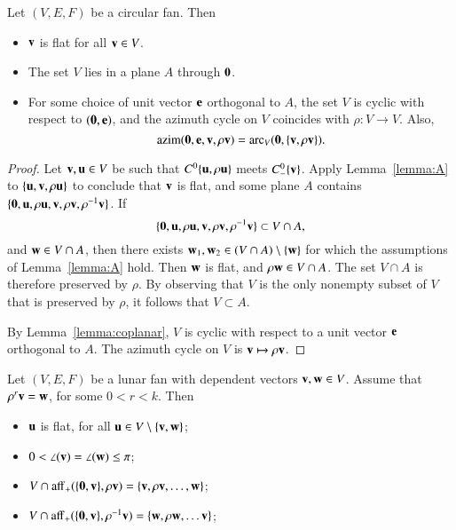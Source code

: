 \begin{lemma}\label{lemma:circular}
Let $(V,E,F)$ be a circular fan. Then
\begin{itemize}
\item ${\mathbf v}$ is flat for all ${\mathbf v}\in V$.
\item The set $V$ lies in a plane $A$ through ${\mathbf 0}$.
\item For some choice of unit vector ${\mathbf e}$ orthogonal to $A$, the set $V$ is cyclic with respect to
$({\mathbf 0},{\mathbf e})$, and the azimuth cycle on $V$ coincides with $\rho:V\to V$.
Also,
$$
{\operatorname{azim}}({\mathbf 0},{\mathbf e},{\mathbf v},\rho{\mathbf v}) = {\operatorname{arc}}_V({\mathbf 0},\{{\mathbf v},\rho {\mathbf v}\}).
$$
\end{itemize}
\end{lemma}

\begin{proof}  Let ${\mathbf v}, {\mathbf u}\in V$ be such that $C^0\{{\mathbf u},\rho {\mathbf u}\}$ meets $C^0_-\{{\mathbf v}\}$.  Apply
Lemma~\ref{lemma:A} to $\{{\mathbf u},{\mathbf v},\rho {\mathbf u}\}$ to conclude that ${\mathbf v}$ is flat, and some plane $A$ contains
$\{{\mathbf 0},{\mathbf u},\rho{\mathbf u},{\mathbf v},\rho {\mathbf v},\rho^{-1} {\mathbf v}\}$.  If 
$$
\{{\mathbf 0},{\mathbf u},\rho {\mathbf u},{\mathbf v},\rho {\mathbf v},\rho^{-1} {\mathbf v}\} \subset V\cap A,
$$
and ${\mathbf w}\in V\cap A$, then there exists ${\mathbf w}_1,{\mathbf w}_2\in (V\cap A)\setminus\{{\mathbf w}\}$ for which
the assumptions of Lemma~\ref{lemma:A} hold.  Then ${\mathbf w}$ is flat, and
$\rho {\mathbf w} \in V\cap A$.  The set $V\cap A$ is therefore preserved by $\rho$.
By observing that $V$ is the only nonempty subset of $V$ that is preserved by $\rho$,
 it follows that $V\subset A$.  


By Lemma~\ref{lemma:coplanar}, $V$ is cyclic with respect to a unit vector ${\mathbf e}$ orthogonal to $A$.  The
azimuth cycle on $V$ is ${\mathbf v} \mapsto \rho {\mathbf v}$.
\end{proof}

\begin{lemma}\label{lemma:lunar}
Let $(V,E,F)$ be a lunar fan with dependent vectors ${\mathbf v},{\mathbf w}\in V$.  
Assume that $\rho^r {\mathbf v} = {\mathbf w}$, for
some $0< r < k$.
Then
\begin{itemize}
\item ${\mathbf u}$ is flat, for all ${\mathbf u}\in V\setminus \{{\mathbf v},{\mathbf w}\}$; \vspace{3pt}
\item $0< \angle({\mathbf v}) = \angle({\mathbf w})\le \pi$; \vspace{3pt}
\item $V\cap {\operatorname{aff}}_+(\{{\mathbf 0},{\mathbf v}\},\rho {\mathbf v}) = \{{\mathbf v},\rho {\mathbf v},\ldots, {\mathbf w}\}$; \vspace{3pt}
\item $V \cap {\operatorname{aff}}_+(\{{\mathbf 0},{\mathbf v}\},\rho^{-1} {\mathbf v}) = \{{\mathbf w},\rho {\mathbf w},\ldots {\mathbf v}\}$;  \vspace{3pt}
\end{itemize}
\end{lemma}

